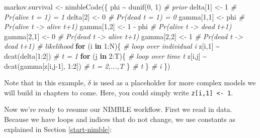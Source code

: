 \documentclass[
  12pt,
]{krantz}
\newenvironment{Shaded}{\begin{snugshade}}{\end{snugshade}}
\newcommand{\CommentTok}[1]{\textcolor[rgb]{0.56,0.35,0.01}{\textit{#1}}}
\newcommand{\ControlFlowTok}[1]{\textcolor[rgb]{0.13,0.29,0.53}{\textbf{#1}}}
\newcommand{\DecValTok}[1]{\textcolor[rgb]{0.00,0.00,0.81}{#1}}
\newcommand{\FunctionTok}[1]{\textcolor[rgb]{0.00,0.00,0.00}{#1}}
\newcommand{\NormalTok}[1]{#1}
\newcommand{\OtherTok}[1]{\textcolor[rgb]{0.56,0.35,0.01}{#1}}
\newcommand{\SpecialCharTok}[1]{\textcolor[rgb]{0.00,0.00,0.00}{#1}}
\begin{document}
\begin{Shaded}
\begin{Highlighting}[]
\NormalTok{markov.survival }\OtherTok{\textless{}{-}} \FunctionTok{nimbleCode}\NormalTok{(\{}
\NormalTok{  phi }\SpecialCharTok{\textasciitilde{}} \FunctionTok{dunif}\NormalTok{(}\DecValTok{0}\NormalTok{, }\DecValTok{1}\NormalTok{) }\CommentTok{\# prior}
\NormalTok{  delta[}\DecValTok{1}\NormalTok{] }\OtherTok{\textless{}{-}} \DecValTok{1}          \CommentTok{\# Pr(alive t = 1) = 1}
\NormalTok{  delta[}\DecValTok{2}\NormalTok{] }\OtherTok{\textless{}{-}} \DecValTok{0}          \CommentTok{\# Pr(dead t = 1) = 0}
\NormalTok{  gamma[}\DecValTok{1}\NormalTok{,}\DecValTok{1}\NormalTok{] }\OtherTok{\textless{}{-}}\NormalTok{ phi      }\CommentTok{\# Pr(alive t {-}\textgreater{} alive t+1)}
\NormalTok{  gamma[}\DecValTok{1}\NormalTok{,}\DecValTok{2}\NormalTok{] }\OtherTok{\textless{}{-}} \DecValTok{1} \SpecialCharTok{{-}}\NormalTok{ phi  }\CommentTok{\# Pr(alive t {-}\textgreater{} dead t+1)}
\NormalTok{  gamma[}\DecValTok{2}\NormalTok{,}\DecValTok{1}\NormalTok{] }\OtherTok{\textless{}{-}} \DecValTok{0}        \CommentTok{\# Pr(dead t {-}\textgreater{} alive t+1)}
\NormalTok{  gamma[}\DecValTok{2}\NormalTok{,}\DecValTok{2}\NormalTok{] }\OtherTok{\textless{}{-}} \DecValTok{1}        \CommentTok{\# Pr(dead t {-}\textgreater{} dead t+1)}
  \CommentTok{\# likelihood}
  \ControlFlowTok{for}\NormalTok{ (i }\ControlFlowTok{in} \DecValTok{1}\SpecialCharTok{:}\NormalTok{N)\{ }\CommentTok{\# loop over individual i}
\NormalTok{    z[i,}\DecValTok{1}\NormalTok{] }\SpecialCharTok{\textasciitilde{}} \FunctionTok{dcat}\NormalTok{(delta[}\DecValTok{1}\SpecialCharTok{:}\DecValTok{2}\NormalTok{]) }\CommentTok{\# t = 1}
    \ControlFlowTok{for}\NormalTok{ (j }\ControlFlowTok{in} \DecValTok{2}\SpecialCharTok{:}\NormalTok{T)\{ }\CommentTok{\# loop over time t}
\NormalTok{      z[i,j] }\SpecialCharTok{\textasciitilde{}} \FunctionTok{dcat}\NormalTok{(gamma[z[i,j}\DecValTok{{-}1}\NormalTok{], }\DecValTok{1}\SpecialCharTok{:}\DecValTok{2}\NormalTok{]) }\CommentTok{\# t = 2,...,T}
\NormalTok{    \} }\CommentTok{\# t}
\NormalTok{  \} }\CommentTok{\# i}
\NormalTok{\})}
\end{Highlighting}
\end{Shaded}

Note that in this example, \(\delta\) is used as a placeholder for more complex models we will build in chapters to come. Here, you could simply write \texttt{z{[}i,1{]}\ \textless{}-\ 1}.

Now we're ready to resume our NIMBLE workflow. First we read in data. Because we have loops and indices that do not change, we use constants as explained in Section \ref{start-nimble}:
\end{document}
